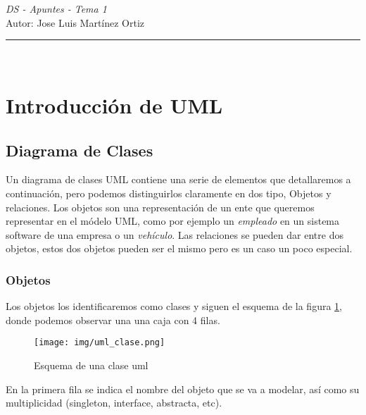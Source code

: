 \documentclass[10pt,a4paper,titlepage]{article}
\date{\normalsize\today} %
\newcommand{\horrule}[1]{\rule{\linewidth}{#1}} %
\begin{document}
\begin{center}
{\Huge \emph{DS - Apuntes - Tema 1} } \\
\vspace{0.5cm}
Autor: Jose Luis Martínez Ortiz\\
\horrule{2pt} \\[0.5cm] %
\vspace{1.5cm}
\end{center}


\date{\normalsize\today} %
\tableofcontents %

\newpage

\section{Introducción de UML}
\subsection{Diagrama de Clases}
Un diagrama de clases UML contiene una serie de elementos que detallaremos a continuación, pero podemos distinguirlos claramente en dos tipo, Objetos y relaciones.
Los objetos son una representación de un ente que queremos representar en el módelo UML, como por ejemplo un \textit{empleado} en un sistema software de una empresa o un \textit{vehículo}. Las relaciones se pueden dar entre dos objetos, estos dos objetos pueden ser el mismo pero es un caso un poco especial.\\

\subsubsection{Objetos}
Los objetos los identificaremos como clases y siguen el esquema de la figura \ref{fig:uml_clase}, donde podemos observar una una caja con 4 filas.

\begin{figure}[H] %
\centering
\texttt{[image: img/uml\_clase.png]}  %
\caption{Esquema de una clase uml} \label{fig:uml_clase}
\end{figure}

En la primera fila se indica el nombre del objeto que se va a modelar, así como su multiplicidad (singleton, interface, abstracta, etc).\\
\end{document}
